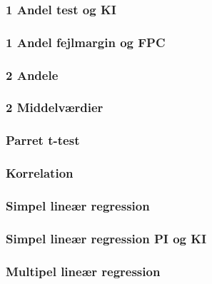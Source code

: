 \documentclass[]{book}
\begin{document}
\hypertarget{andel-test-og-ki-1}{%
\subsubsection{1 Andel test og KI}\label{andel-test-og-ki-1}}

\hypertarget{andel-fejlmargin-og-fpc-1}{%
\subsubsection{1 Andel fejlmargin og FPC}\label{andel-fejlmargin-og-fpc-1}}

\hypertarget{andele}{%
\subsubsection{2 Andele}\label{andele}}

\hypertarget{middelvrdier}{%
\subsubsection{2 Middelværdier}\label{middelvrdier}}

\hypertarget{parret-t-test}{%
\subsubsection{Parret t-test}\label{parret-t-test}}

\hypertarget{korrelation}{%
\subsubsection{Korrelation}\label{korrelation}}

\hypertarget{simpel-liner-regression}{%
\subsubsection{Simpel lineær regression}\label{simpel-liner-regression}}

\hypertarget{simpel-liner-regression-pi-og-ki}{%
\subsubsection{Simpel lineær regression PI og KI}\label{simpel-liner-regression-pi-og-ki}}

\hypertarget{multipel-liner-regression}{%
\subsubsection{Multipel lineær regression}\label{multipel-liner-regression}}
\end{document}
